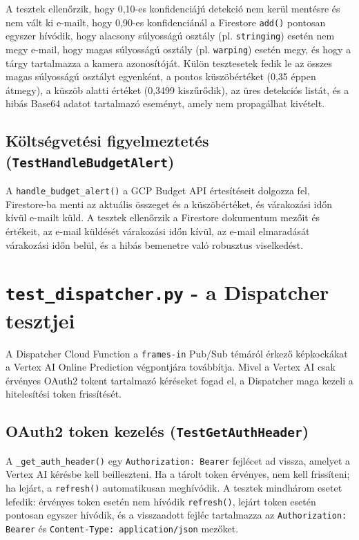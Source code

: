 \documentclass[12pt,a4paper]{article}
\begin{document}
A tesztek ellenőrzik, hogy 0,10-es konfidenciájú detekció nem kerül mentésre és
nem vált ki e-mailt, hogy 0,90-es konfidenciánál a Firestore \texttt{add()}
pontosan egyszer hívódik, hogy alacsony súlyosságú osztály (pl. \texttt{stringing})
esetén nem megy e-mail, hogy magas súlyosságú osztály (pl. \texttt{warping}) esetén
megy, és hogy a tárgy tartalmazza a kamera azonosítóját. Külön tesztesetek fedik
le az összes magas súlyosságú osztályt egyenként, a pontos küszöbértéket (0,35
éppen átmegy), a küszöb alatti értéket (0,3499 kiszűrődik), az üres detekciós
listát, és a hibás Base64 adatot tartalmazó eseményt, amely nem propagálhat
kivételt.

\subsection{Költségvetési figyelmeztetés (\texttt{TestHandleBudgetAlert})}

A \texttt{handle\_budget\_alert()} a GCP Budget API értesítéseit dolgozza fel,
Firestore-ba menti az aktuális összeget és a küszöbértéket, és várakozási időn kívül
e-mailt küld. A tesztek ellenőrzik a Firestore dokumentum mezőit és értékeit,
az e-mail küldését várakozási időn kívül, az e-mail elmaradását várakozási időn belül,
és a hibás bemenetre való robusztus viselkedést.

\section{\texttt{test\_dispatcher.py} - a Dispatcher tesztjei}

A Dispatcher Cloud Function a \texttt{frames-in} Pub/Sub témáról érkező képkockákat
a Vertex AI Online Prediction végpontjára továbbítja. Mivel a Vertex AI csak érvényes
OAuth2 tokent tartalmazó kéréseket fogad el, a Dispatcher maga kezeli a
hitelesítési token frissítését.

\subsection{OAuth2 token kezelés (\texttt{TestGetAuthHeader})}

A \texttt{\_get\_auth\_header()} egy \texttt{Authorization: Bearer} fejlécet ad
vissza, amelyet a Vertex AI kérésbe kell beilleszteni. Ha a tárolt token érvényes,
nem kell frissíteni; ha lejárt, a \texttt{refresh()} automatikusan meghívódik.
A tesztek mindhárom esetet lefedik: érvényes token esetén nem hívódik \texttt{refresh()},
lejárt token esetén pontosan egyszer hívódik, és a visszaadott fejléc tartalmazza
az \texttt{Authorization: Bearer} és \texttt{Content-Type: application/json}
mezőket.
\end{document}
